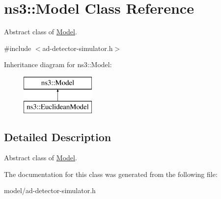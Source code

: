 \hypertarget{classns3_1_1Model}{}\section{ns3\+:\+:Model Class Reference}
\label{classns3_1_1Model}


Abstract class of \hyperlink{classns3_1_1Model}{Model}.  




{\ttfamily \#include $<$ad-\/detector-\/simulator.\+h$>$}

Inheritance diagram for ns3\+:\+:Model\+:\begin{figure}[H]
\begin{center}
\leavevmode
\includegraphics[height=2.000000cm]{classns3_1_1Model}
\end{center}
\end{figure}


\subsection{Detailed Description}
Abstract class of \hyperlink{classns3_1_1Model}{Model}. 

The documentation for this class was generated from the following file\+:\begin{DoxyCompactItemize}
\item 
model/ad-\/detector-\/simulator.\+h\end{DoxyCompactItemize}
